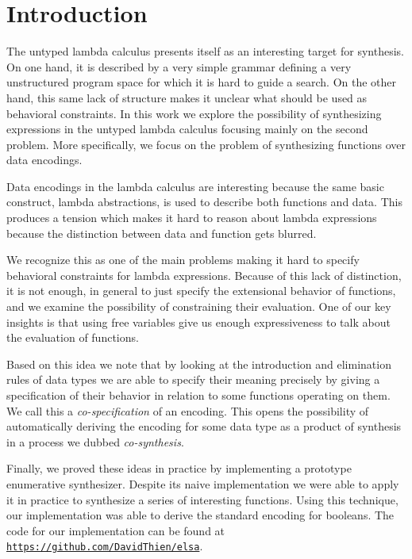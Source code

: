 \section{Introduction} \label{sec:intro}
%
The untyped lambda calculus presents itself as an interesting
target for synthesis.
%
On one hand, it is described by a very simple grammar
defining a very unstructured program space for which it is
hard to guide a search.
%
On the other hand, this same lack of structure makes it
unclear what should be used as behavioral constraints.
%
In this work we explore the possibility of synthesizing
expressions in the untyped lambda calculus focusing mainly
on the second problem.
%
More specifically, we focus on the problem of synthesizing
functions over data encodings.

Data encodings in the lambda calculus are interesting
because the same basic construct, lambda abstractions, is
used to describe both functions and data.
%
This produces a tension which makes it hard to reason about
lambda expressions because the distinction between data and
function gets blurred.

We recognize this as one of the main problems making it
hard to specify behavioral constraints for lambda
expressions.
%
Because of this lack of distinction, it is not enough, in
general to just specify the extensional behavior of
functions, and we examine the possibility of constraining
their evaluation.
%
One of our key insights is that using free variables give us
enough expressiveness to talk about the evaluation of
functions.

Based on this idea we note that by looking at the
introduction and elimination rules of data types we are able
to specify their meaning precisely by giving a specification
of their behavior in relation to some functions operating on
them.
%
We call this a \emph{co-specification} of an encoding.
%
This opens the possibility of automatically deriving the
encoding for some data type as a product of synthesis in a
process we dubbed \emph{co-synthesis}.

Finally, we proved these ideas in practice by implementing a
prototype enumerative synthesizer.
%
Despite its naive implementation we were able to apply it in
practice to synthesize a series of interesting functions.
%
Using this technique, our implementation was able to derive
the standard encoding for booleans.
%
The code for our implementation can be found at \\
\href{https://github.com/DavidThien/elsa}
{\texttt{https://github.com/DavidThien/elsa}}.

